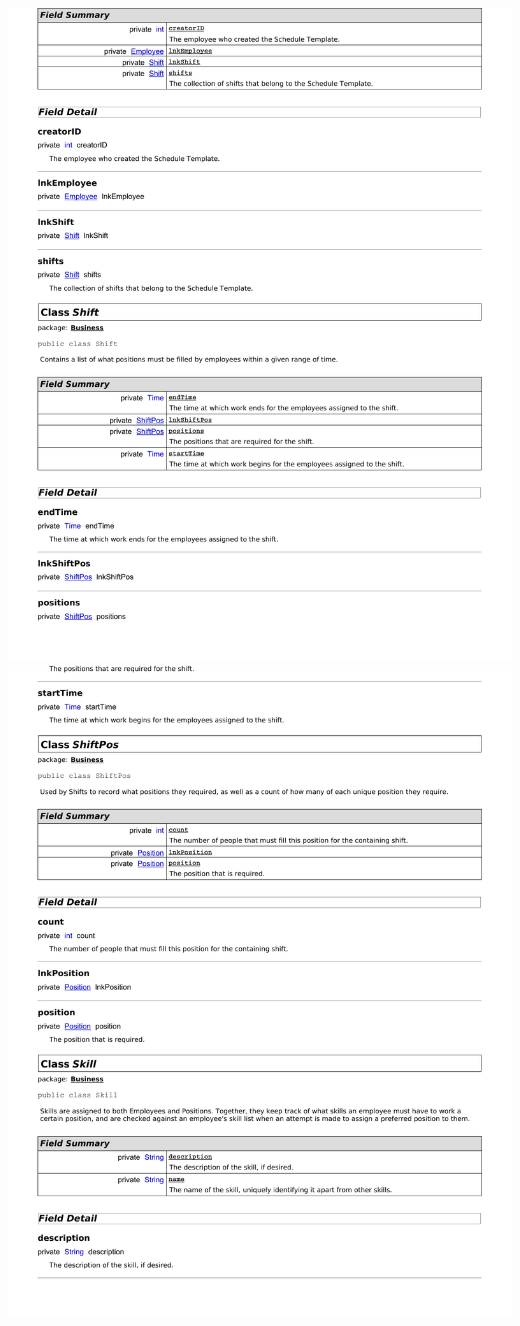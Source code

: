 \documentclass[letterpaper,12pt]{report}
\begin{document}
\newpage
\includegraphics[scale=0.9,trim=20mm 30mm 25mm 8mm]{externals/db10.pdf}
\newpage
\includegraphics[scale=0.9,trim=20mm 30mm 25mm 8mm]{externals/db11.pdf}
\end{document}
